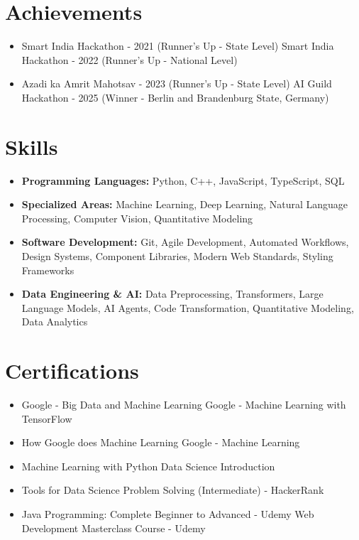 \documentclass[a4paper,10pt]{article}
\begin{document}
\section*{Achievements}
\begin{itemize}
\item Smart India Hackathon - 2021 (Runner's Up - State Level) \hfill Smart India Hackathon - 2022 (Runner's Up - National Level)
\item Azadi ka Amrit Mahotsav - 2023 (Runner's Up - State Level) \hfill AI Guild Hackathon - 2025 (Winner - Berlin and Brandenburg State, Germany)
\end{itemize}

\section*{Skills}
\begin{itemize}
  \item \textbf{Programming Languages:} Python, C++, JavaScript, TypeScript, SQL
  \item \textbf{Specialized Areas:} Machine Learning, Deep Learning, Natural Language Processing, Computer Vision, Quantitative Modeling
  \item \textbf{Software Development:} Git, Agile Development, Automated Workflows, Design Systems, Component Libraries, Modern Web Standards, Styling Frameworks
  \item \textbf{Data Engineering \& AI:} Data Preprocessing, Transformers, Large Language Models, AI Agents, Code Transformation, Quantitative Modeling, Data Analytics
\end{itemize}

\section*{Certifications}
\begin{itemize}
\item Google - Big Data and Machine Learning \hfill Google - Machine Learning with TensorFlow
\item How Google does Machine Learning \hfill Google - Machine Learning
\item Machine Learning with Python \hfill Data Science Introduction
\item Tools for Data Science \hfill Problem Solving (Intermediate) - HackerRank
\item Java Programming: Complete Beginner to Advanced - Udemy \hfill Web Development Masterclass Course - Udemy
\end{itemize}
\end{document}
